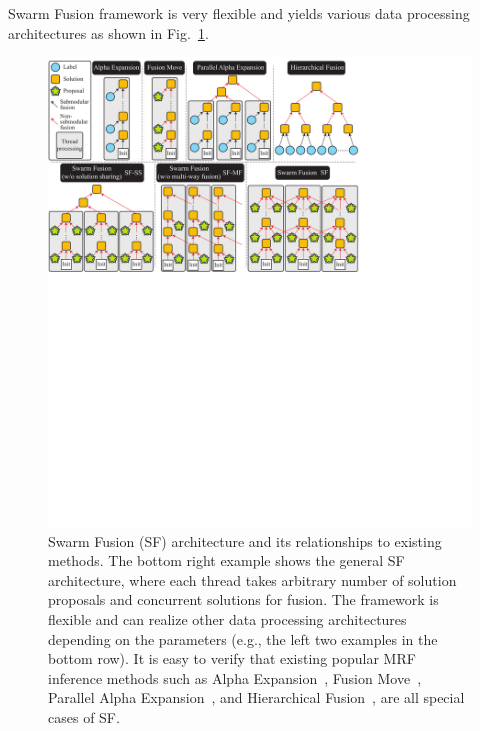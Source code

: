 Swarm Fusion framework is very flexible and yields various data
processing architectures as shown in Fig.~\ref{fig:model}.
%
\begin{figure}[tb]
 \includegraphics[width=\columnwidth]{figure/model.pdf} \caption{Swarm
   Fusion (SF) architecture and its relationships to existing methods. The
 bottom right example shows the general SF architecture, where
 each thread takes arbitrary number of solution proposals and concurrent
 solutions for fusion. The framework is flexible and
 can realize other data processing architectures depending on the
 parameters (e.g., the left two examples in the bottom row).
 It is easy to verify that existing popular MRF inference methods such
 as Alpha Expansion~\cite{alpha_expansion}, Fusion Move~\cite{fusion_moves_for_markov_random_field_optimization},
 Parallel Alpha Expansion~\cite{olga_hierarchical_alpha_expansion}, and Hierarchical
 Fusion~\cite{delong_hierarchical_fusion}, are all special cases of
 SF.}
\label{fig:model}
\end{figure}
